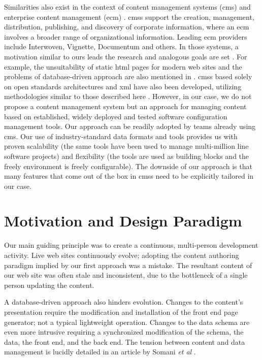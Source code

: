 \documentclass{article}
\begin{document}
Similarities also exist in the context of content management systems ({\sc cms}) \cite{SET02,MT04}
and enterprise content management ({\sc ecm}) \cite{NP04}.
{\sc cms}s support the creation, management, distribution, publishing, and discovery of corporate information, where an {\sc ecm} 
involves a broader range of organizational information. Leading {\sc ecm} providers include Interwoven, 
Vignette, Documentum and others. In those systems, a motivation similar to ours 
leads the research and analogous goals are set \cite{KW05,DOC05}. For example, the unsuitability of static {\sc html} pages for modern 
web sites and the problems of database-driven approach are also mentioned in \cite{KW05}. 
{\sc cms}s based solely on open standards architectures and
{\sc xml} have also been developed,
utilizing methodologies similar to those described here \cite{XYW02,OS05}.
However, in our case,
we do not propose a content management system but an approach for managing content based on established, widely deployed 
and tested software configuration management tools. Our approach can be readily adopted by teams already using {\sc cms}. 
Our use of industry-standard data formats and tools provides us with proven scalability (the same tools have been used 
to manage multi-million line software projects) and flexibility (the tools are used as building blocks and the
freely environment is freely configurable).
The downside of our approach is that many features that come out of the box in {\sc cms}s need 
to be explicitly tailored in our case.

\section{Motivation and Design Paradigm}
\label{sec:design}

Our main guiding principle was to create a continuous, multi-person development activity.
Live web sites continuously evolve;
adopting the content authoring paradigm implied
by our first approach was a mistake.
The resultant content of our web site was often stale and inconsistent,
due to the bottleneck of a single person updating the content.

A database-driven approach also hinders evolution.
Changes to the content's presentation require the modification
and installation of the front end page generator;
not a typical lightweight operation.
Changes to the data schema are even more intrusive
requiring a synchronized modification of the schema,
the data, the front end, and the back end.
The tension between content and data management is lucidly
detailed in an article by Somani {\em et al} \cite{SCK02}.
\end{document}
